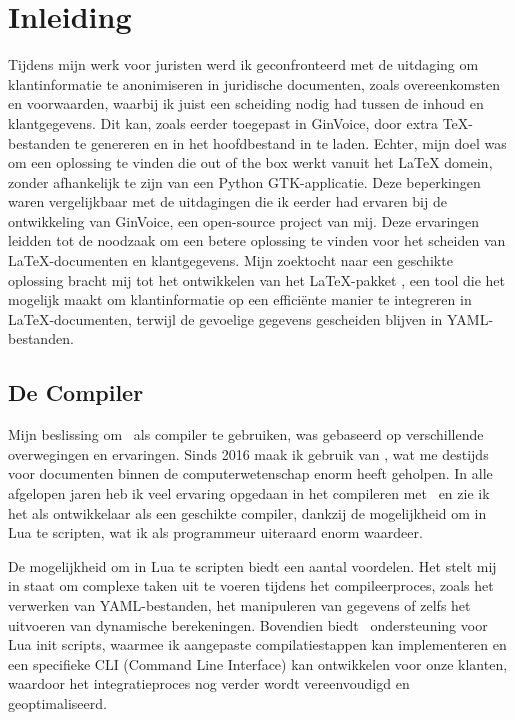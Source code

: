 \section{Inleiding}
Tijdens mijn werk voor juristen werd ik geconfronteerd met de uitdaging om klantinformatie te anonimiseren in juridische documenten, zoals overeenkomsten en voorwaarden, waarbij ik juist een scheiding nodig had tussen de inhoud en klantgegevens.
Dit kan, zoals eerder toegepast in GinVoice, door extra TeX-bestanden te genereren en in het hoofdbestand in te laden.
Echter, mijn doel was om een oplossing te vinden die out of the box werkt vanuit het LaTeX domein, zonder afhankelijk te zijn van een Python GTK-applicatie.
Deze beperkingen waren vergelijkbaar met de uitdagingen die ik eerder had ervaren bij de ontwikkeling van GinVoice\cite{ginvoice}, een open-source project van mij.
Deze ervaringen leidden tot de noodzaak om een betere oplossing te vinden voor het scheiden van \LaTeX-documenten en klantgegevens.
Mijn zoektocht naar een geschikte oplossing bracht mij tot het ontwikkelen van het \LaTeX-pakket \cite{lua-placeholders}, een tool die het mogelijk maakt om klantinformatie op een efficiënte manier te integreren in \LaTeX-documenten, terwijl de gevoelige gegevens gescheiden blijven in YAML-bestanden.

\subsection{De Compiler}
Mijn beslissing om \LuaLaTeX\ als compiler te gebruiken, was gebaseerd op verschillende overwegingen en ervaringen.
Sinds 2016 maak ik gebruik van \LuaLaTeX, wat me destijds voor documenten binnen de computerwetenschap enorm heeft geholpen.
In alle afgelopen jaren heb ik veel ervaring opgedaan in het compileren met \LuaLaTeX\ en zie ik het als ontwikkelaar als een geschikte compiler, dankzij de mogelijkheid om in Lua te scripten, wat ik als programmeur uiteraard enorm waardeer.

De mogelijkheid om in Lua te scripten biedt een aantal voordelen.
Het stelt mij in staat om complexe taken uit te voeren tijdens het compileerproces, zoals het verwerken van YAML-bestanden, het manipuleren van gegevens of zelfs het uitvoeren van dynamische berekeningen.
Bovendien biedt \LuaLaTeX\ ondersteuning voor Lua init scripts, waarmee ik aangepaste compilatiestappen kan implementeren en een specifieke CLI (Command Line Interface) kan ontwikkelen voor onze klanten, waardoor het integratieproces nog verder wordt vereenvoudigd en geoptimaliseerd.


